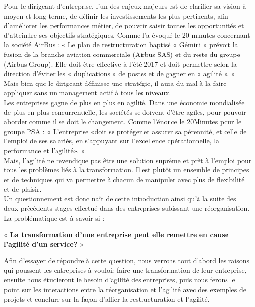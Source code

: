 \documentclass[12pt,a4paper]{article}
\begin{document}
Pour le dirigeant d’entreprise, l'un des enjeux majeurs est de clarifier sa vision à moyen et long terme, de définir les investissements les plus pertinents, afin d’améliorer les performances métier, de pouvoir saisir toutes les opportunités et d’atteindre ses objectifs stratégiques. Comme l'a évoqué le 20 minutes concernant la société AirBus : « Le plan de restructuration baptisé « Gémini » prévoit la fusion de la branche aviation commerciale (Airbus SAS) et du reste du groupe (Airbus Group). Elle doit être effective à l’été 2017 et doit permettre selon la direction d’éviter les « duplications » de postes et de gagner en « agilité ». » Mais bien que le dirigeant définisse une stratégie, il aura du mal à la faire appliquer sans un management actif à tous les niveaux.\\

Les entreprises gagne de plus en plus en agilité. Dans une économie mondialisée de plus en plus concurrentielle, les sociétés se doivent d'être agiles, pour pouvoir aborder comme il se doit le changement. Comme l'énonce le 20Minutes pour le groupe PSA : « L'entreprise «doit se protéger et assurer sa pérennité, et celle de l'emploi de ses salariés, en s'appuyant sur l'excellence opérationnelle, la performance et l'agilité». ».\\


Mais, l'agilité ne revendique pas être une solution suprême et prêt à l'emploi pour tous les problèmes liés à la transformation. Il est plutôt un ensemble de principes et de techniques qui va permettre à chacun de manipuler avec plus de flexibilité et de plaisir.\\


Un questionnement est donc naît de cette introduction ainsi qu'à la suite des deux précédents stages effectué dans des entreprises subissant une réorganisation. La problématique est à savoir si :\\
\begin{center}
« \textbf{La transformation d'une entreprise peut elle remettre en cause l'agilité d'un service?} »\\
\end{center}



Afin d’essayer de répondre à cette question, nous verrons tout d’abord les raisons qui poussent les entreprises à vouloir faire une transformation de leur entreprise, ensuite nous étudieront le besoin d’agilité des entreprises, puis nous ferons le point sur les interactions entre la réorganisation et l’agilité avec des exemples de projets et conclure sur la façon d’allier la restructuration et l'agilité.
\end{document}
